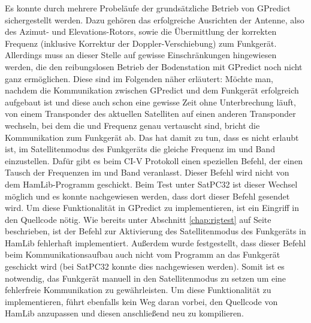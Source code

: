 Es konnte durch mehrere Probeläufe der grundsätzliche Betrieb von GPredict sichergestellt werden. Dazu gehören das erfolgreiche Ausrichten der Antenne, also des Azimut- und Elevations-Rotors, sowie die Übermittlung der korrekten Frequenz (inklusive Korrektur der Doppler-Verschiebung) zum Funkgerät. Allerdings muss an dieser Stelle auf gewisse Einschränkungen hingewiesen werden, die den reibungslosen Betrieb der Bodenstation mit GPredict noch nicht ganz ermöglichen. Diese sind im Folgenden näher erläutert:\newpar
Möchte man, nachdem die Kommunikation zwischen GPredict und dem Funkgerät erfolgreich aufgebaut ist und diese auch schon eine gewisse Zeit ohne Unterbrechung läuft, von einem Transponder des aktuellen Satelliten auf einen anderen Transponder wechseln, bei dem die  und Frequenz genau vertauscht sind, bricht die Kommunikation zum Funkgerät ab. Das hat damit zu tun, dass es nicht erlaubt ist, im Satellitenmodus des Funkgeräts die gleiche Frequenz im  und Band einzustellen. Dafür gibt es beim CI-V Protokoll einen speziellen Befehl, der einen Tausch der Frequenzen im  und Band veranlasst. Dieser Befehl wird nicht von dem HamLib-Programm  geschickt. Beim Test unter SatPC32 ist dieser Wechsel möglich und es konnte nachgewiesen werden, dass dort dieser Befehl gesendet wird. Um diese Funktionalität in GPredict zu implementieren, ist ein Eingriff in den Quellcode nötig.\newpar
Wie bereits unter Abschnitt \ref{chap:rigtest} auf Seite \pageref{satmode} beschrieben, ist der Befehl zur Aktivierung des Satellitenmodus des Funkgeräts in HamLib fehlerhaft implementiert. Außerdem wurde festgestellt, dass dieser Befehl beim Kommunikationsaufbau auch nicht vom Programm  an das Funkgerät geschickt wird (bei SatPC32 konnte dies nachgewiesen werden). Somit ist es notwendig, das Funkgerät manuell in den Satellitenmodus zu setzen um eine fehlerfreie Kommunikation zu gewährleisten. Um diese Funktionalität zu implementieren, führt ebenfalls kein Weg daran vorbei, den Quellcode von HamLib anzupassen und diesen anschließend neu zu kompilieren.

\newpage

